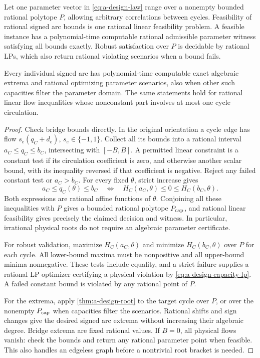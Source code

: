 \begin{theorem}
\label{thm:a-design-global-capacity}
Let one parameter vector in \eqref{eq:a-design-law} range over a
nonempty bounded rational polytope $P$, allowing arbitrary correlations
between cycles.  Feasibility of rational signed arc bounds is one
rational linear feasibility problem.  A feasible instance has a
polynomial-time computable rational admissible parameter witness
satisfying all bounds exactly.  Robust satisfaction over $P$ is
decidable by rational LPs, which also return rational violating
scenarios when a bound fails.

Every individual signed arc has polynomial-time computable exact
algebraic extrema and rational optimizing parameter scenarios, also
when other such capacities filter the parameter domain.  The same
statements hold for rational linear flow inequalities whose
nonconstant part involves at most one cycle circulation.
\end{theorem}

\begin{proof}
Check bridge bounds directly.  In the original orientation a cycle
edge has flow $s_e(q_C+d_e)$, $s_e\in\{-1,1\}$.  Collect all its
bounds into a rational interval $a_C\le q_C\le b_C$, intersecting
with $[-B,B]$.  A permitted linear constraint is a constant test if
its circulation coefficient is zero, and otherwise another scalar
bound, with its inequality reversed if that coefficient is negative.
Reject any failed constant test or $a_C>b_C$.
For every fixed $\theta$, strict increase gives
\begin{equation}
 a_C\le q_C(\theta)\le b_C
 \quad\Longleftrightarrow\quad
 H_C(a_C,\theta)\le0\le H_C(b_C,\theta).
 \label{eq:a-design-capacity-lp}
\end{equation}
Both expressions are rational affine functions of $\theta$.  Conjoining
all these inequalities with $P$ gives a bounded rational polytope
$P_{\rm cap}$, and rational linear feasibility gives precisely the
claimed decision and witness.  In particular, irrational physical roots
do not require an algebraic parameter certificate.

For robust validation, maximize $H_C(a_C,\theta)$ and minimize
$H_C(b_C,\theta)$ over $P$ for each cycle.  All lower-bound maxima
must be nonpositive and all upper-bound minima nonnegative.  These
tests include equality, and a strict failure supplies a rational LP
optimizer certifying a physical violation by
\eqref{eq:a-design-capacity-lp}.  A failed constant bound is violated
by any rational point of $P$.

For the extrema, apply \cref{thm:a-design-root} to the target cycle over
$P$, or over the nonempty $P_{\rm cap}$ when capacities filter the
scenarios.  Rational shifts and sign changes give the desired signed arc
extrema without increasing their algebraic degree.  Bridge extrema are
fixed rational values.  If $B=0$, all physical flows vanish: check the
bounds and return any rational parameter point when feasible.  This also
handles an edgeless graph before a nontrivial root bracket is needed.
\end{proof}

